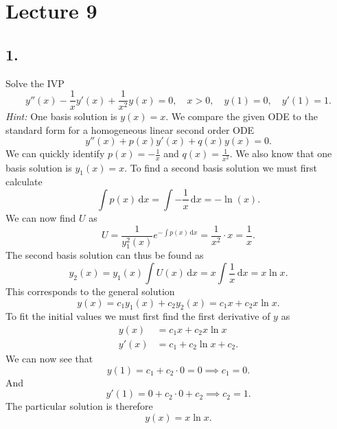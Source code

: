\section*{Lecture 9}

\subsection*{1.} Solve the IVP
\[ 
y''(x) - \frac{1}{x} y'(x) + \frac{1}{x^2}y(x) = 0, \quad x > 0, \quad y(1) = 0, \quad y'(1) = 1
.\]
\textit{Hint:} One basis solution is $y(x) = x$.
\bigbreak
We compare the given ODE to the standard form for a homogeneous linear second order ODE
\[ 
y''(x) + p(x) y'(x) + q(x)y(x) = 0
.\]
We can quickly identify $p(x) = -\frac{1}{x}$ and $q(x) = \frac{1}{x^2}$. We also know that one basis solution is $y_1(x) = x$. To find a second basis solution we must first calculate
\[ 
\int p(x) \, \mathrm{d}x = \int -\frac{1}{x}\, \mathrm{d}x  = - \ln(x)
.\]
We can now find $U$ as
\[ 
U = \frac{1}{y_1^2(x)} e^{- \int p(x) \, \mathrm{d}x } = \frac{1}{x^2} \cdot x = \frac{1}{x}
.\]
The second basis solution can thus be found as
\[ 
y_2(x) = y_1(x) \int U(x) \, \mathrm{d}x = x \int \frac{1}{x} \, \mathrm{d}x = x \ln x
.\]
This corresponds to the general solution
\[ 
y(x) = c_1 y_1(x) + c_2 y_2(x) = c_1 x + c_2 x \ln x
.\]
To fit the initial values we must first find the first derivative of $y$ as
\begin{align*}
  y(x) &= c_1 x + c_2 x \ln x \\
  y'(x) &= c_1 + c_2 \ln x + c_2
.\end{align*}
We can now see that
\[ 
y(1) = c_1 + c_2 \cdot 0 = 0 \implies c_1 = 0
.\]
And
\[ 
y'(1) = 0 + c_2 \cdot 0 + c_2 \implies c_2 = 1
.\]
The particular solution is therefore
\[ 
y(x) = x \ln x
.\]


